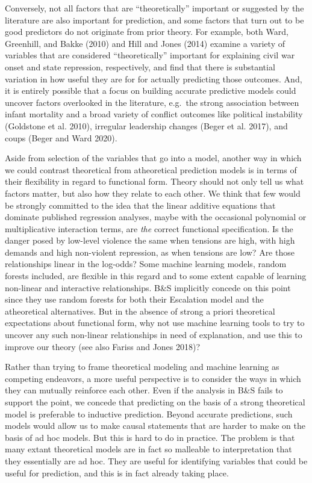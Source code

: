 \documentclass[
]{article}
\begin{document}
Conversely, not all factors that are ``theoretically'' important or suggested by the literature are also important for prediction, and some factors that turn out to be good predictors do not originate from prior theory. For example, both Ward, Greenhill, and Bakke (2010) and Hill and Jones (2014) examine a variety of variables that are considered ``theoretically'' important for explaining civil war onset and state repression, respectively, and find that there is substantial variation in how useful they are for for actually predicting those outcomes. And, it is entirely possible that a focus on building accurate predictive models could uncover factors overlooked in the literature, e.g.~the strong association between infant mortality and a broad variety of conflict outcomes like political instability (Goldstone et al. 2010), irregular leadership changes (Beger et al. 2017), and coups (Beger and Ward 2020).

Aside from selection of the variables that go into a model, another way in which we could contrast theoretical from atheoretical prediction models is in terms of their flexibility in regard to functional form. Theory should not only tell us what factors matter, but also how they relate to each other. We think that few would be strongly committed to the idea that the linear additive equations that dominate published regression analyses, maybe with the occasional polynomial or multiplicative interaction terms, are \emph{the} correct functional specification. Is the danger posed by low-level violence the same when tensions are high, with high demands and high non-violent repression, as when tensions are low? Are those relationships linear in the log-odds? Some machine learning models, random forests included, are flexible in this regard and to some extent capable of learning non-linear and interactive relationships. B\&S implicitly concede on this point since they use random forests for both their Escalation model and the atheoretical alternatives. But in the absence of strong a priori theoretical expectations about functional form, why not use machine learning tools to try to uncover any such non-linear relationships in need of explanation, and use this to improve our theory (see also Fariss and Jones 2018)?

Rather than trying to frame theoretical modeling and machine learning as competing endeavors, a more useful perspective is to consider the ways in which they can mutually reinforce each other. Even if the analysis in B\&S fails to support the point, we concede that predicting on the basis of a strong theoretical model is preferable to inductive prediction. Beyond accurate predictions, such models would allow us to make causal statements that are harder to make on the basis of ad hoc models. But this is hard to do in practice. The problem is that many extant theoretical models are in fact so malleable to interpretation that they essentially are ad hoc. They are useful for identifying variables that could be useful for prediction, and this is in fact already taking place.
\end{document}
